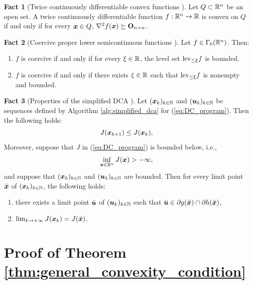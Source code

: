 \documentclass[lettersize,journal]{IEEEtran}
\theoremstyle{plain}%
\theoremstyle{definition}
\newtheorem{fact}{Fact}
\theoremstyle{remark}
\begin{document}
\begin{fact}[Twice continuously differentiable convex functions {\cite[Thm. 2.1.4]{nesterov2018}}]\label{fact:twice_differentiable_convex}
Let $Q\subset\mathbb{R}^n$ be an open set. A twice continuously differentiable function $f:\mathbb{R}^n\to\mathbb{R}$ is convex on $Q$ if and only if for every $\bm{x}\in Q$, $\nabla^2 f(\bm{x})\succeq \mathbf{O}_{n\times n}$.
\end{fact}

\begin{fact}[Coercive proper lower semicontinuous functions {\cite[Prop. 11.12 and 11.13]{bauschke2017}}]\label{fact:coercive_lsc_functions}
Let $f\in\Gamma_0(\mathbb{R}^n)$. Then:
\begin{enumerate}
\item $f$ is coercive if and only if for every $\xi\in\mathbb{R}$, the level set $\mathrm{lev}_{\leq \xi}f$ is bounded.

\item $f$ is coercive if and only if there exists $\xi\in\mathbb{R}$ such that $\mathrm{lev}_{\leq \xi}f$ is nonempty and bounded.
\end{enumerate}
\end{fact}

\begin{fact}[Properties of the simplified DCA {\cite[Thm. 3 (i)(iv)]{pham1997}}]\label{fact:properties_of_DCA} Let $(\bm{x}_k)_{k\in\mathbb{N}}$ and $(\bm{u}_k)_{k\in\mathbb{N}}$ be sequences defined by Algorithm \ref{alg:simplified_dca} for (\ref{eq:DC_program}). Then the following holds:
\[J(\bm{x}_{k+1})\leq J(\bm{x}_k),\]
Moreover, suppose that $J$ in (\ref{eq:DC_program}) is bounded below, i.e., \[\inf_{\bm{x}\in\mathbb{R}^n}J(\bm{x})>-\infty,\]
and suppose that $(\bm{x}_k)_{k\in\mathbb{N}}$ and $(\bm{u}_k)_{k\in\mathbb{N}}$ are bounded. Then for every limit point $\bar{\bm{x}}$ of $(\bm{x}_k)_{k\in\mathbb{N}}$, the following holds:
\begin{enumerate}
\item there exists a limit point $\bar{\bm{u}}$ of $(\bm{u}_k)_{k\in\mathbb{N}}$ such that $\bar{\bm{u}}\in\partial g(\bar{\bm{x}})\cap \partial h(\bar{\bm{x}})$,

\item $\lim_{k\to +\infty}J(\bm{x}_k)=J(\bar{\bm{x}})$.
\end{enumerate}

\end{fact}


\section{Proof of Theorem \ref{thm:general_convexity_condition}}
\label{app:general_convexity_condition}
\end{document}
